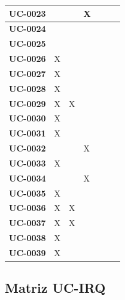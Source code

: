\documentclass[11pt, a4paper]{article}
\begin{document}
\begin{center}
{\begin{longtable}{|p{2.2cm}|p{2.0cm}|p{2.0cm}|p{2.0cm}|p{2.0cm}|p{2.0cm}|p{2.0cm}|}
\hline
\textbf{UC-0023} &  &  & X &  &  &  \\
\hline
\textbf{UC-0024} &  &  &  &  &  &  \\
\hline
\textbf{UC-0025} &  &  &  &  &  &  \\
\hline
\textbf{UC-0026} & X &  &  &  &  &  \\
\hline
\textbf{UC-0027} & X &  &  &  &  &  \\
\hline
\textbf{UC-0028} & X &  &  &  &  &  \\
\hline
\textbf{UC-0029} & X & X &  &  &  &  \\
\hline
\textbf{UC-0030} & X &  &  &  &  &  \\
\hline
\textbf{UC-0031} & X &  &  &  &  &  \\
\hline
\textbf{UC-0032} &  &  & X &  &  &  \\
\hline
\textbf{UC-0033} & X &  &  &  &  &  \\
\hline
\textbf{UC-0034} &  &  & X &  &  &  \\
\hline
\textbf{UC-0035} & X &  &  &  &  &  \\
\hline
\textbf{UC-0036} & X & X &  &  &  &  \\
\hline
\textbf{UC-0037} & X & X &  &  &  &  \\
\hline
\textbf{UC-0038} & X &  &  &  &  &  \\
\hline
\textbf{UC-0039} & X &  &  &  &  &  \\
\hline

\end{longtable}
}
\end{center}


\subsection{Matriz UC-IRQ}
\end{document}
